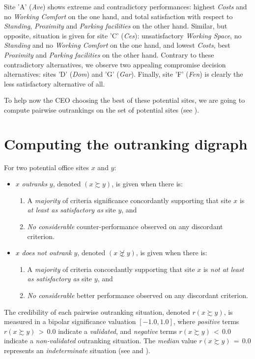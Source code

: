 Site 'A' (\emph{Ave}) shows extreme and contradictory performances: highest \emph{Costs} and no \emph{Working Comfort} on the one hand, and total satisfaction with respect to \emph{Standing}, \emph{Proximity} and \emph{Parking facilities} on the other hand. Similar, but opposite, situation is given for site 'C' (\emph{Ces}): unsatisfactory \emph{Working Space}, no \emph{Standing} and no \emph{Working Comfort} on the one hand, and lowest \emph{Costs}, best \emph{Proximity} and \emph{Parking facilities} on the other hand. Contrary to these contradictory alternatives, we observe two appealing compromise decision alternatives: sites 'D' (\emph{Dom}) and 'G' (\emph{Gar}). Finally, site 'F' (\emph{Fen}) is clearly the less satisfactory alternative of all.

To help now the CEO choosing the best of these potential sites, we are going to compute pairwise outrankings on the set of potential sites (see \citet{BIS-2013}).

\section{Computing the outranking digraph}
\label{sec:6.2}

\begin{definition}
For two potential office sites $x$ and $y$:
\begin{itemize}
\item $x$ \emph{outranks} $y$, denoted $(x \succsim y)$, is given when there is:
   \begin{enumerate}
     \item A \emph{majority} of criteria significance concordantly supporting that site $x$ is \emph{at least as satisfactory as} site $y$, and
     \item \emph{No considerable} counter-performance observed on any discordant criterion.      
    \end{enumerate}
\item $x$ \emph{does not outrank} $y$, denoted $(x \not\succsim y)$, is given when there is:
   \begin{enumerate}
    \item A \emph{majority} of criteria concordantly supporting that site $x$ is \emph{not at least as satisfactory as} site $y$, and
    \item \emph{No considerable} better performance observed on any discordant criterion.
    \end{enumerate}
\end{itemize}
\end{definition}
The credibility of each pairwise outranking situation, denoted $r(x \succsim y)$, is measured in a bipolar significance valuation $[-1.0, 1.0]$, where \emph{positive} terms $r(x \succsim y)\, >\, 0.0$ indicate a \emph{validated}, and \emph{negative} terms $r(x \succsim y)\, <\, 0.0$ indicate a \emph{non-validated} outranking situation. The \emph{median} value $r(x \succsim y)\, = \,0.0$ represents an \emph{indeterminate} situation (see \citet{BIS-2004a} and \citet{BIS-2013}).   

